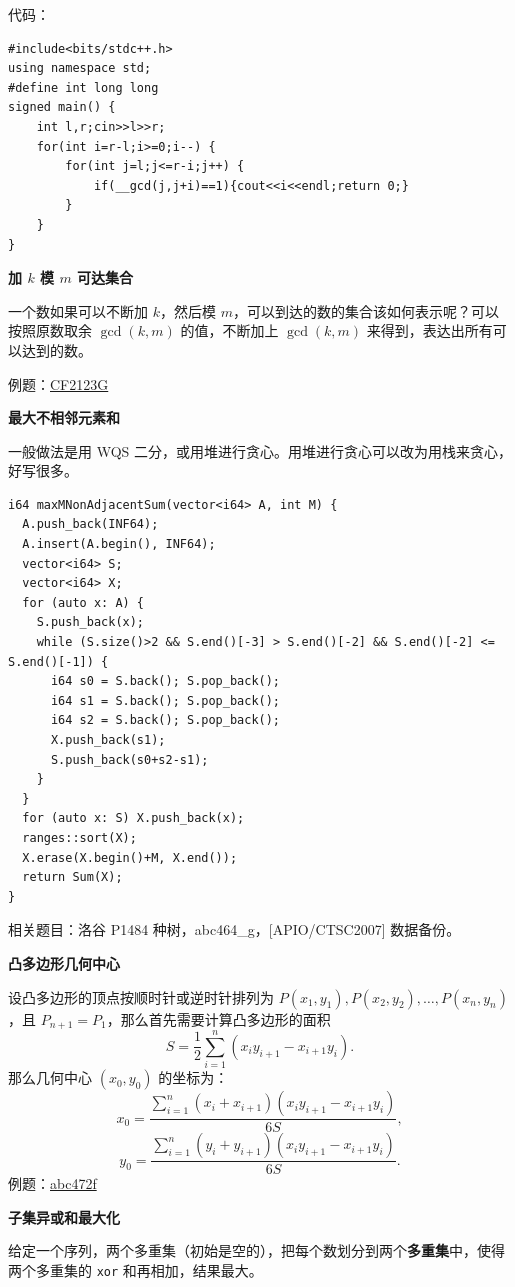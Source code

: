 代码：
\begin{verbatim}
#include<bits/stdc++.h>
using namespace std;
#define int long long
signed main() {
    int l,r;cin>>l>>r;
    for(int i=r-l;i>=0;i--) {
        for(int j=l;j<=r-i;j++) {
            if(__gcd(j,j+i)==1){cout<<i<<endl;return 0;}
        }
    }
}
\end{verbatim}

\par\medskip\noindent\textbf{加 $k$ 模 $m$ 可达集合}\par\smallskip
一个数如果可以不断加 $k$，然后模 $m$，可以到达的数的集合该如何表示呢？可以按照原数取余 $\gcd(k,m)$ 的值，不断加上 $\gcd(k,m)$ 来得到，表达出所有可以达到的数。

例题：\href{https://codeforces.com/contest/2123/problem/G}{CF2123G}

\par\medskip\noindent\textbf{最大不相邻元素和}\par\smallskip
一般做法是用 WQS 二分，或用堆进行贪心。用堆进行贪心可以改为用栈来贪心，好写很多。

\begin{verbatim}
i64 maxMNonAdjacentSum(vector<i64> A, int M) {
  A.push_back(INF64);
  A.insert(A.begin(), INF64);
  vector<i64> S;
  vector<i64> X;
  for (auto x: A) {
    S.push_back(x);
    while (S.size()>2 && S.end()[-3] > S.end()[-2] && S.end()[-2] <= S.end()[-1]) {
      i64 s0 = S.back(); S.pop_back();
      i64 s1 = S.back(); S.pop_back();
      i64 s2 = S.back(); S.pop_back();
      X.push_back(s1);
      S.push_back(s0+s2-s1);
    }
  }
  for (auto x: S) X.push_back(x);
  ranges::sort(X);
  X.erase(X.begin()+M, X.end());
  return Sum(X);
}
\end{verbatim}

相关题目：洛谷 P1484 种树，abc464\_g，[APIO/CTSC2007] 数据备份。

\par\medskip\noindent\textbf{凸多边形几何中心}\par\smallskip
设凸多边形的顶点按顺时针或逆时针排列为 $P(x_1,y_1),P(x_2,y_2),\ldots,P(x_n,y_n)$，且 $P_{n+1}=P_1$，那么首先需要计算凸多边形的面积
\[
S=\frac{1}{2}\sum_{i=1}^{n}(x_i y_{i+1}-x_{i+1}y_i).
\]
那么几何中心 $(x_0,y_0)$ 的坐标为：
\[
x_0=\frac{\sum_{i=1}^{n}(x_i+x_{i+1})(x_i y_{i+1}-x_{i+1}y_i)}{6S},
\]
\[
y_0=\frac{\sum_{i=1}^{n}(y_i+y_{i+1})(x_i y_{i+1}-x_{i+1}y_i)}{6S}.
\]
例题：\href{https://atcoder.jp/contests/abc472/tasks/abc472_f}{abc472f}

\par\medskip\noindent\textbf{子集异或和最大化}\par\smallskip
给定一个序列，两个多重集（初始是空的），把每个数划分到两个\textbf{多重集}中，使得两个多重集的 \texttt{xor} 和再相加，结果最大。


